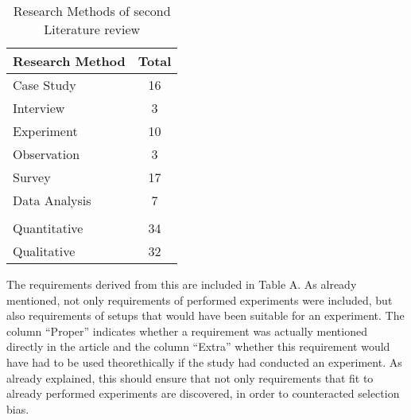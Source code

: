 \begin{table}[htbp]
    \centering
    \small
    \begin{tabular}{ll}
    \hline
    \multicolumn{1}{l}{Research Method} & \multicolumn{1}{l}{Total} \\ \hline
    \multicolumn{1}{l}{Case  Study}     & \multicolumn{1}{c}{16}    \\ 
    \multicolumn{1}{l}{Interview}       & \multicolumn{1}{c}{3}     \\ 
    \multicolumn{1}{l}{Experiment}      & \multicolumn{1}{c}{10}    \\ 
    \multicolumn{1}{l}{Observation}     & \multicolumn{1}{c}{3}     \\ 
    \multicolumn{1}{l}{Survey}          & \multicolumn{1}{c}{17}    \\ 
    \multicolumn{1}{l}{Data Analysis}   & \multicolumn{1}{c}{7}     \\ 
                                            &                            \\ \hline
    \multicolumn{1}{l}{Quantitative}    & \multicolumn{1}{c}{34}    \\ 
    \multicolumn{1}{l}{Qualitative}     & \multicolumn{1}{c}{32}    \\ \hline
    \end{tabular}
    \caption[Research Methods of second Literature review]{Research Methods of second Literature review}\label{tab:secondLiteratureSearch}
    \end{table}

The requirements derived from this are included in Table A. As already mentioned, not only requirements of performed experiments were included, but also requirements of setups that would have been suitable for an experiment. The column \enquote{Proper} indicates whether a requirement was actually mentioned directly in the article and the column \enquote{Extra} whether this requirement would have had to be used theorethically if the study had conducted an experiment. As already explained, this should ensure that not only requirements that fit to already performed experiments are discovered, in order to counteracted selection bias.

